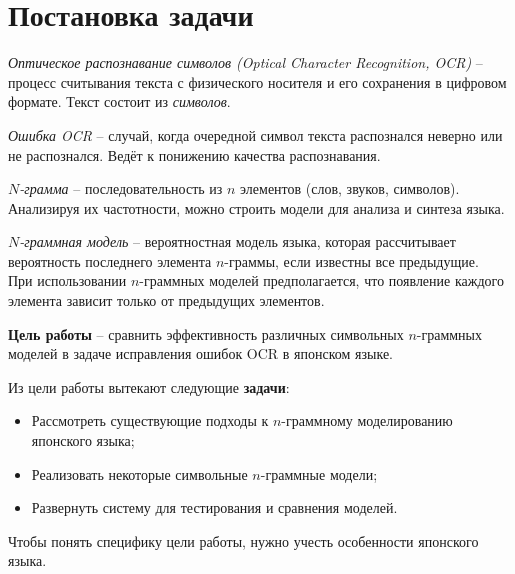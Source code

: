 
\section{ Постановка задачи }\label{sec:taskdef}

\begin{definition}{\textit{Оптическое распознавание символов (Optical Character Recognition, OCR)}} -- процесс считывания текста с физического носителя и его сохранения в цифровом формате. Текст состоит из \textit{символов}.
\end{definition}

\begin{definition}{\textit{Ошибка OCR}} -- случай, когда очередной символ текста распознался неверно или не распознался. Ведёт к понижению качества распознавания.
\end{definition}

\begin{definition}{\textit{$N$-грамма}} -- последовательность из $n$ элементов (слов, звуков, символов). Анализируя их частотности, можно строить модели для анализа и синтеза языка.
\end{definition}

\begin{definition}{\textit{$N$-граммная модель}} -- вероятностная модель языка, которая рассчитывает вероятность последнего элемента $n$-граммы, если известны все предыдущие. \\
При использовании $n$-граммных моделей предполагается, что появление каждого элемента зависит только от предыдущих элементов.
\end{definition}

\textbf{Цель работы} -- сравнить эффективность различных символьных $n$-граммных моделей в задаче исправления ошибок OCR в японском языке.

Из цели работы вытекают следующие \textbf{задачи}:
\begin{itemize}
	\item Рассмотреть существующие подходы к $n$-граммному моделированию японского языка;
	
	\item Реализовать некоторые символьные $n$-граммные модели;
	
	\item Развернуть систему для тестирования и сравнения моделей.
\end{itemize}

Чтобы понять специфику цели работы, нужно учесть особенности японского языка.

